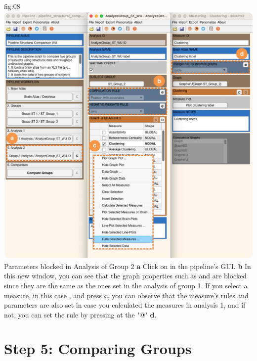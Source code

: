 \documentclass[justified]{tufte-handout}
\begin{document}
	{fig:08}
	{
	\includegraphics{fig08.jpg}
	}
	{Parameters blocked in Analysis of Group 2}
	{
	{\bf a} Click on  in the pipeline's GUI.
	{\bf b} In this new window, you can see that the graph properties such as  and  are blocked since they are the same as the ones set in the analysis of group 1. If you select a measure, in this case , and press  {\bf c}, you can observe that the measure's rules and parameters are also set in case you calculated the measures in analysis 1, and if not, you can set the rule by pressing at the "@" {\bf d}.
	}
 
\section{Step 5: Comparing Groups}
\end{document}
